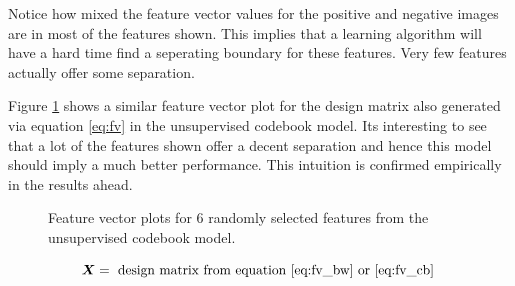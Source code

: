 \documentclass[10pt,twocolumn,letterpaper]{article}
\begin{document}
Notice how mixed the feature vector values for the positive and negative images are in most of the features
shown. This implies that a learning algorithm will have a hard time find a seperating boundary for these features.
Very few features actually offer some separation.

Figure \ref{fig:fv_cb} shows a similar feature vector plot for the design matrix also generated via
equation \ref{eq:fv} in the unsupervised codebook model. Its interesting to see that a lot of 
the features shown offer a decent separation and hence this model should imply a much
better performance. This intuition is confirmed empirically in the results ahead.

\begin{figure}[t]
\begin{center}
\end{center}
   \caption{Feature vector plots for 6 randomly selected features from the unsupervised codebook model.}
\label{fig:fv_cb}
\end{figure}

\[\boldsymbol{X} = \text{ design matrix from equation \ref{eq:fv_bw} or \ref{eq:fv_cb} } \]
\end{document}
